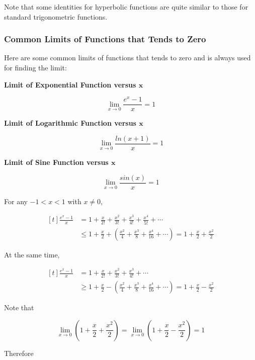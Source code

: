 Note that some identities for hyperbolic functions are quite similar to those for standard trigonometric functions.

\subsubsection{Common Limits of Functions that Tends to Zero}
\begin{thm}
  Here are some common limits of functions that tends to zero and is always used for finding the limit:

  \begin{alist}
    \item \textbf{Limit of Exponential Function versus $\boldsymbol{x}$}

    $$\lim_{x\to 0}\frac{e^{x}-1}{x}=1$$

    \item \textbf{Limit of Logarithmic Function versus $\boldsymbol{x}$}

    $$\lim_{x\to 0}\frac{ln(x+1)}{x}=1$$

    \item \textbf{Limit of Sine Function versus $\boldsymbol{x}$}

    $$\lim_{x\to 0}\frac{sin(x)}{x}=1$$

  \end{alist}

   For any $-1<x<1$ with $x\neq 0$,

  $$\begin{aligned}[t]
    \frac{e^{x}-1}{x}&=1+\frac{x}{2!}+\frac{x^{2}}{3!}+\frac{x^{3}}{4!}+\frac{x^{4}}{5!}+\cdots\\
    &\leq 1+\frac{x}{2}+(\frac{x^{2}}{4}+\frac{x^{3}}{8}+\frac{x^{4}}{16}+\cdots)=1+\frac{x}{2}+\frac{x^{2}}{2}
  \end{aligned}$$\s

  At the same time,

  $$\begin{aligned}[t]
    \frac{e^{x}-1}{x}&=1+\frac{x}{2!}+\frac{x^{2}}{3!}+\frac{x^{3}}{4!}+\cdots\\
    &\geq 1+\frac{x}{2}-(\frac{x^{2}}{4}+\frac{x^{3}}{8}+\frac{x^{4}}{16}+\cdots)=1+\frac{x}{2}-\frac{x^{2}}{2}
  \end{aligned}$$\s

  Note that

  $$\lim_{x\to 0}(1+\frac{x}{2}+\frac{x^{2}}{2})=\lim_{x\to 0}(1+\frac{x}{2}-\frac{x^{2}}{2})=1$$\s

  Therefore


\end{thm}
